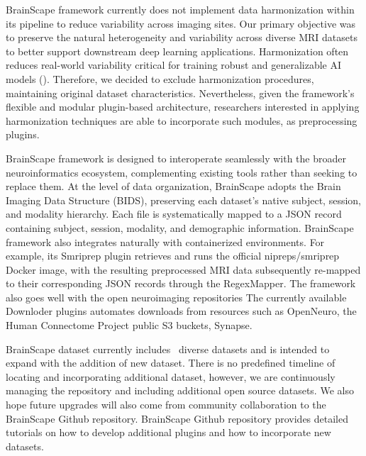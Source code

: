 BrainScape framework currently does not implement data harmonization within its pipeline to reduce variability across imaging sites. 
Our primary objective was to preserve the natural heterogeneity and variability across diverse MRI datasets to better support 
downstream deep learning applications. Harmonization often reduces real-world variability critical for training robust and 
generalizable AI models (\cite{adkinson2024brain}).
Therefore, we decided to exclude harmonization procedures, maintaining original dataset characteristics.
Nevertheless, given the framework's flexible and modular plugin-based architecture, 
researchers interested in applying harmonization techniques are able to incorporate such modules, as preprocessing plugins.

BrainScape framework is designed to interoperate seamlessly with the broader neuroinformatics ecosystem, 
complementing existing tools rather than seeking to replace them. 
At the level of data organization, BrainScape adopts the Brain Imaging Data Structure (BIDS), 
preserving each dataset's native subject, session, and modality hierarchy. 
Each file is systematically mapped to a JSON record containing subject, session, modality, and demographic information. 
BrainScape framework also integrates naturally with containerized environments. 
For example, its Smriprep plugin retrieves and runs the official nipreps/smriprep Docker image, 
with the resulting preprocessed MRI data subsequently re-mapped to their corresponding JSON records through the RegexMapper. 
The framework also goes well with the open neuroimaging repositories
The currently available Downloder plugins automates downloads from resources such as OpenNeuro, 
the Human Connectome Project public S3 buckets, Synapse. 

BrainScape dataset currently includes \NumDatasets\ diverse datasets and is intended to expand with the addition of new dataset. 
There is no predefined timeline of locating and incorporating additional dataset, however, we are continuously managing 
the repository and including additional open source datasets.
We also hope future upgrades will also come from community collaboration to the BrainScape Github repository.
BrainScape Github repository provides detailed tutorials on how to develop additional plugins and how to incorporate new datasets.

